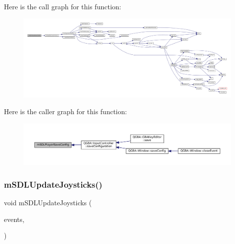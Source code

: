 Here is the call graph for this function\+:
\nopagebreak
\begin{figure}[H]
\begin{center}
\leavevmode
\includegraphics[width=350pt]{sdl-events_8h_a21daeab8663f45a3ab0104f8ae0abb18_cgraph}
\end{center}
\end{figure}
Here is the caller graph for this function\+:
\nopagebreak
\begin{figure}[H]
\begin{center}
\leavevmode
\includegraphics[width=350pt]{sdl-events_8h_a21daeab8663f45a3ab0104f8ae0abb18_icgraph}
\end{center}
\end{figure}
\mbox{\label{sdl-events_8h_a6174eb5a5de369faa9936c653489d8ee}} 
\subsubsection{\texorpdfstring{m\+S\+D\+L\+Update\+Joysticks()}{mSDLUpdateJoysticks()}}
{\footnotesize\ttfamily void m\+S\+D\+L\+Update\+Joysticks (\begin{DoxyParamCaption}\item[{struct \mbox{\hyperlink{sdl-events_8h_structm_s_d_l_events}{m\+S\+D\+L\+Events}} $\ast$}]{events,  }\item[{const struct Configuration $\ast$}]{ }\end{DoxyParamCaption})}

